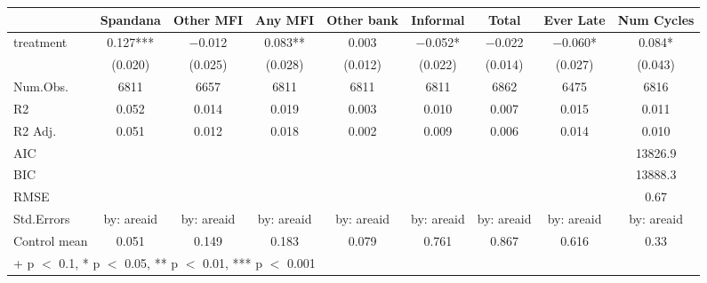 \begin{table}
\centering
\begin{tabular}[t]{lcccccccc}
\toprule
  & Spandana & Other MFI & Any MFI & Other bank & Informal & Total & Ever Late & Num Cycles\\
\midrule
treatment & \num{0.127}*** & \num{-0.012} & \num{0.083}** & \num{0.003} & \num{-0.052}* & \num{-0.022} & \num{-0.060}* & \num{0.084}*\\
 & (\num{0.020}) & (\num{0.025}) & (\num{0.028}) & (\num{0.012}) & (\num{0.022}) & (\num{0.014}) & (\num{0.027}) & (\num{0.043})\\
\midrule
Num.Obs. & \num{6811} & \num{6657} & \num{6811} & \num{6811} & \num{6811} & \num{6862} & \num{6475} & \num{6816}\\
R2 & \num{0.052} & \num{0.014} & \num{0.019} & \num{0.003} & \num{0.010} & \num{0.007} & \num{0.015} & \num{0.011}\\
R2 Adj. & \num{0.051} & \num{0.012} & \num{0.018} & \num{0.002} & \num{0.009} & \num{0.006} & \num{0.014} & \num{0.010}\\
AIC &  &  &  &  &  &  &  & \num{13826.9}\\
BIC &  &  &  &  &  &  &  & \num{13888.3}\\
RMSE &  &  &  &  &  &  &  & \num{0.67}\\
Std.Errors & by: areaid & by: areaid & by: areaid & by: areaid & by: areaid & by: areaid & by: areaid & by: areaid\\
Control mean & \num{0.051} & \num{0.149} & \num{0.183} & \num{0.079} & \num{0.761} & \num{0.867} & \num{0.616} & \num{0.33}\\
\bottomrule
\multicolumn{9}{l}{\rule{0pt}{1em}+ p $<$ 0.1, * p $<$ 0.05, ** p $<$ 0.01, *** p $<$ 0.001}\\
\end{tabular}
\end{table}
